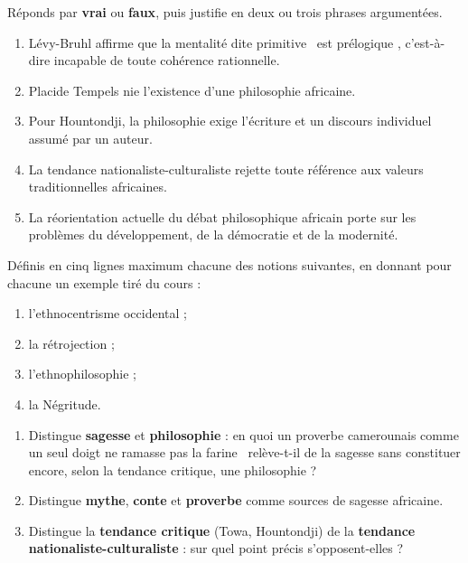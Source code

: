 \documentclass[11pt]{article}
\newcommand{\cle}[1]{{\popxbold\color{popdark}#1}}
\begin{document}
\begin{exercice}
Réponds par \textbf{vrai} ou \textbf{faux}, puis justifie en deux ou trois phrases argumentées.
\begin{enumerate}
\item Lévy-Bruhl affirme que la mentalité dite \guillemotleft primitive \guillemotright\ est \guillemotleft prélogique \guillemotright, c'est-à-dire incapable de toute cohérence rationnelle.
\item Placide Tempels nie l'existence d'une philosophie africaine.
\item Pour Hountondji, la philosophie exige l'écriture et un discours individuel assumé par un auteur.
\item La tendance nationaliste-culturaliste rejette toute référence aux valeurs traditionnelles africaines.
\item La réorientation actuelle du débat philosophique africain porte sur les problèmes du développement, de la démocratie et de la modernité.
\end{enumerate}
\end{exercice}

\begin{exercice}
Définis en cinq lignes maximum chacune des notions suivantes, en donnant pour chacune un exemple tiré du cours :
\begin{enumerate}
\item l'\cle{ethnocentrisme} occidental ;
\item la \cle{rétrojection} ;
\item l'\cle{ethnophilosophie} ;
\item la \cle{Négritude}.
\end{enumerate}
\end{exercice}

\begin{exercice}
\begin{enumerate}
\item Distingue \textbf{sagesse} et \textbf{philosophie} : en quoi un proverbe camerounais comme \guillemotleft un seul doigt ne ramasse pas la farine \guillemotright\ relève-t-il de la sagesse sans constituer encore, selon la tendance critique, une philosophie ?
\item Distingue \textbf{mythe}, \textbf{conte} et \textbf{proverbe} comme sources de sagesse africaine.
\item Distingue la \textbf{tendance critique} (Towa, Hountondji) de la \textbf{tendance nationaliste-culturaliste} : sur quel point précis s'opposent-elles ?
\end{enumerate}
\end{exercice}
\end{document}
